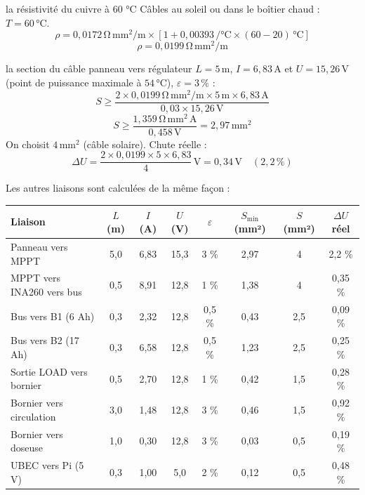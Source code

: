 \documentclass[11pt,a4paper]{article}
\newcommand{\U}[1]{\,\mathrm{#1}}
\begin{document}
\begin{calcul}{la résistivité du cuivre à 60 °C}
Câbles au soleil ou dans le boîtier chaud : $T = 60\U{°C}$.
\[
\rho = 0{,}0172\U{\Omega\,mm^2/m} \times \left[ 1 + 0{,}00393\U{/°C} \times (60 - 20)\U{°C} \right]
\]
\[
\rho = 0{,}0199\U{\Omega\,mm^2/m}
\]
\end{calcul}

\begin{calcul}{la section du câble panneau vers régulateur}
$L = 5\U{m}$, $I = 6{,}83\U{A}$ et $U = 15{,}26\U{V}$ (point de puissance maximale à $54\U{°C}$), $\varepsilon = 3\U{\%}$ :
\[
S \ge \frac{2 \times 0{,}0199\U{\Omega\,mm^2/m} \times 5\U{m} \times 6{,}83\U{A}}{0{,}03 \times 15{,}26\U{V}}
\]
\[
S \ge \frac{1{,}359\U{\Omega\,mm^2\,A}}{0{,}458\U{V}} = 2{,}97\U{mm^2}
\]
On choisit $4\U{mm^2}$ (câble solaire). Chute réelle :
\[
\Delta U = \frac{2 \times 0{,}0199 \times 5 \times 6{,}83}{4}\U{V} = 0{,}34\U{V} \quad (2{,}2\U{\%})
\]
\end{calcul}

Les autres liaisons sont calculées de la même façon :

\begin{center}
\small
\begin{tabular}{l c c c c c c c}
\toprule
\textbf{Liaison} & \textbf{$L$ (m)} & \textbf{$I$ (A)} & \textbf{$U$ (V)} & \textbf{$\varepsilon$} & \textbf{$S_{\min}$ (mm²)} & \textbf{$S$ (mm²)} & \textbf{$\Delta U$ réel} \\
\midrule
Panneau vers MPPT & 5,0 & 6,83 & 15,3 & 3 \% & 2,97 & 4 & 2,2 \% \\
MPPT vers INA260 vers bus & 0,5 & 8,91 & 12,8 & 1 \% & 1,38 & 4 & 0,35 \% \\
Bus vers B1 (6 Ah) & 0,3 & 2,32 & 12,8 & 0,5 \% & 0,43 & 2,5 & 0,09 \% \\
Bus vers B2 (17 Ah) & 0,3 & 6,58 & 12,8 & 0,5 \% & 1,23 & 2,5 & 0,25 \% \\
Sortie LOAD vers bornier & 0,5 & 2,70 & 12,8 & 1 \% & 0,42 & 1,5 & 0,28 \% \\
Bornier vers circulation & 3,0 & 1,48 & 12,8 & 3 \% & 0,46 & 1,5 & 0,92 \% \\
Bornier vers doseuse & 1,0 & 0,30 & 12,8 & 3 \% & 0,03 & 0,5 & 0,19 \% \\
UBEC vers Pi (5 V) & 0,3 & 1,00 & 5,0 & 2 \% & 0,12 & 0,5 & 0,48 \% \\
\bottomrule
\end{tabular}
\end{center}
\end{document}
